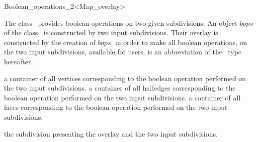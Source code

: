 
\ccRefPageBegin



\begin{ccRefClass}{Boolean_operations_2<Map_overlay>}
\label{OVL_sec:bops}
    
\ccDefinition
The class \ccClassTemplateName\ provides boolean operations 
on two given subdivisions. 
An object $bops$ of the class \ccClassTemplateName\ is constructed by two input subdivisions. 
Their overlay is constructed by the creation of $bops$, in order to make all boolean 
operations, on the two input subdivisions, available for users.
 is an abbreviation of the \ccRefName\ type hereafter.


\ccTypes

  \ccGlue
  {a container of all vertices corresponding to the boolean operation performed on the two input subdivisions.}
  \ccGlue
  {a container of all halfedges corresponding to the boolean operation performed on the two input subdivisions.}
  \ccGlue
  {a container of all faces corresponding to the boolean operation performed on the two input subdivisions.}

  {the subdivision presenting the overlay and the two input subdivisions.}
  

\end{ccRefClass}
